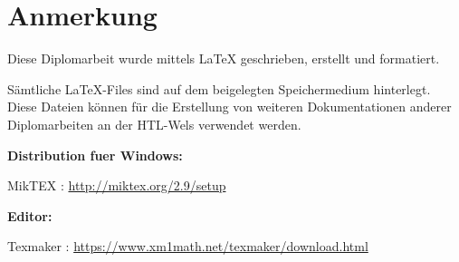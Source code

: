 \chapter*{Anmerkung}

Diese Diplomarbeit wurde mittels LaTeX geschrieben, erstellt und formatiert.


Sämtliche LaTeX-Files sind auf dem beigelegten Speichermedium hinterlegt. Diese Dateien können für die Erstellung von weiteren Dokumentationen anderer Diplomarbeiten an der HTL-Wels verwendet werden.
\bigskip

\textbf{Distribution fuer Windows:}

MikTEX :    \url{http://miktex.org/2.9/setup}

\textbf{Editor:}

Texmaker : \url{https://www.xm1math.net/texmaker/download.html}

